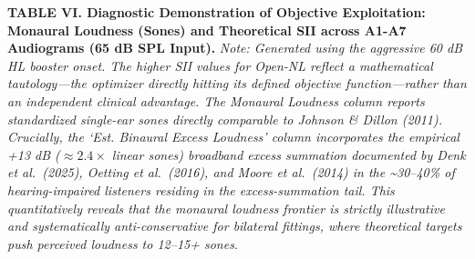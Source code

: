 \documentclass[
  12pt,
]{article}
\begin{document}
\textbf{TABLE VI. Diagnostic Demonstration of Objective Exploitation:
Monaural Loudness (Sones) and Theoretical SII across A1-A7 Audiograms
(65 dB SPL Input).} \emph{Note: Generated using the aggressive 60 dB HL
booster onset. The higher SII values for Open-NL reflect a mathematical
tautology---the optimizer directly hitting its defined objective
function---rather than an independent clinical advantage. The Monaural
Loudness column reports standardized single-ear sones directly
comparable to Johnson \& Dillon (2011). Crucially, the `Est. Binaural
Excess Loudness' column incorporates the empirical +13 dB
(\(\approx 2.4\times\) linear sones) broadband excess summation
documented by Denk et al.~(2025), Oetting et al.~(2016), and Moore et
al.~(2014) in the \textasciitilde30--40\% of hearing-impaired listeners
residing in the excess-summation tail. This quantitatively reveals that
the monaural loudness frontier is strictly illustrative and
systematically anti-conservative for bilateral fittings, where
theoretical targets push perceived loudness to 12--15+ sones.}
\end{document}
